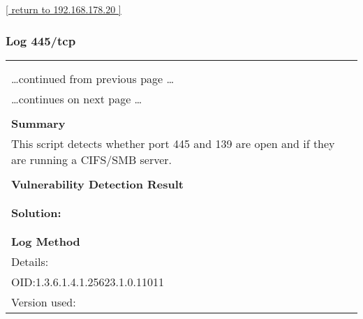 \documentclass{article}
\begin{document}
\begin{footnotesize}\hyperref[host:192.168.178.20]{[ return to 192.168.178.20 ]}\end{footnotesize}
\subsubsection{Log 445/tcp}
\label{port:192.168.178.20 445/tcp Log}

\begin{longtable}{|p{}|}
\hline
\rowcolor{gvm_log}{\color{white}{Log (CVSS: 0.0) }}\\
\rowcolor{gvm_log}{\color{white}{NVT: SMB/CIFS Server Detection}}\\
\hline
\endfirsthead
\hfill\ldots continued from previous page \ldots \\
\hline
\endhead
\hline
\ldots continues on next page \ldots \\
\endfoot
\hline
\endlastfoot
\\
\textbf{Summary}\\
This script detects whether port 445 and 139 are open and
  if they are running a CIFS/SMB server.\\

        \hline
        \\
\textbf{Vulnerability Detection Result}\\
\rowcolor{white}{\verb=A CIFS server is running on this port=}\\

          \hline
          \\
\textbf{Solution:}\\
\\


        \hline
        \\
\textbf{Log Method}\\
Details:
\rowcolor{white}{\verb=SMB/CIFS Server Detection=}\\
OID:1.3.6.1.4.1.25623.1.0.11011\\
Version used:
\rowcolor{white}{\verb=2020-11-10T15:30:28Z=}\\
\end{longtable}
\end{document}
